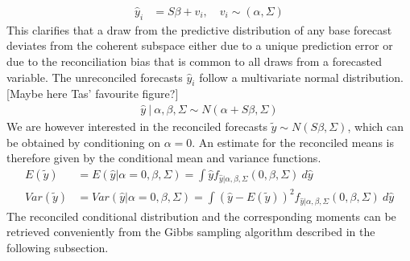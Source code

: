 \documentclass[a4paper,fleqn,11pt]{article}
\begin{document}
\begin{align}
	\hat{y}_i &=  S\beta + v_i, \quad v_i \sim (\alpha,\Sigma)
\end{align}
This clarifies that a draw from the predictive distribution of any base forecast deviates from the coherent subspace either due to a unique prediction error or due to the reconciliation bias that is common to all draws from a forecasted variable. The unreconciled forecasts $\hat{y}_{i}$ follow a multivariate normal distribution. [Maybe here Tas' favourite figure?]
\begin{align}
\hat{y}\ |\ \alpha,\beta,\Sigma \sim N(\alpha + S\beta,\Sigma)
\end{align}
We are however interested in the reconciled forecasts $\tilde{y} \sim N(S\beta,\Sigma)$, which can be obtained by conditioning on $\alpha = 0$. An estimate for the reconciled means is therefore given by the conditional mean and variance functions.
\begin{align*}
E(\tilde{y}) &= E(\hat{y}|\alpha = 0,\beta,\Sigma) = \int \hat{y} f_{\hat{y}|\alpha,\beta,\Sigma}(0,\beta,\Sigma)\ d\hat{y} \\
Var(\tilde{y}) &= Var(\hat{y}|\alpha = 0,\beta,\Sigma) =  \int (\hat{y} - E(\tilde{y}))^2 f_{\hat{y}|\alpha,\beta,\Sigma}(0,\beta,\Sigma)\ d\hat{y}
\end{align*}
The reconciled conditional distribution and the corresponding moments can be retrieved conveniently from the Gibbs sampling algorithm described in the following subsection.\\
\end{document}
